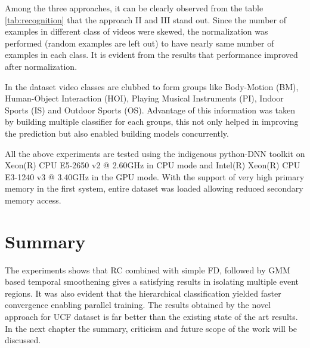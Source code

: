 Among the three approaches, it can be clearly observed from the table \ref{tab:recognition} that the approach II and III  stand out. Since the number of examples in different class of videos were skewed, the normalization was performed (random examples are left out) to have nearly same number of examples in each class. It is evident from the results that performance improved after normalization.
\par In the dataset video classes are clubbed to form groups like Body-Motion (BM), Human-Object Interaction (HOI), Playing Musical Instruments (PI), Indoor Sports (IS) and Outdoor Sports (OS). Advantage of this information was taken by building multiple classifier for each groups, this not only helped in improving the prediction but also enabled building models concurrently.

\par All the above experiments are tested using the indigenous python-DNN toolkit on  Xeon(R) CPU E5-2650 v2 @ 2.60GHz in CPU mode and Intel(R) Xeon(R) CPU E3-1240 v3 @ 3.40GHz in the GPU mode. With the support of very high primary memory in  the first system, entire dataset was loaded allowing reduced secondary memory access.

\section{Summary}
The experiments shows that RC combined with simple FD, followed by GMM based temporal smoothening gives a satisfying results in isolating multiple event regions. It was also evident that the  hierarchical classification yielded  faster convergence enabling parallel training. The results obtained by the novel approach  for UCF dataset is far better than the existing state of the art results. In the next chapter the summary, criticism and future scope of the work will be discussed.